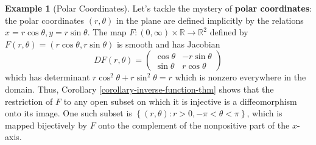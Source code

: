 \documentclass[reqno]{amsart}
\theoremstyle{plain}%
\theoremstyle{definition}
\newtheorem{example}[theorem]{Example}
\theoremstyle{remark}
\begin{document}
        \begin{example}[Polar Coordinates]
          Let's tackle the mystery of \textbf{polar coordinates}: the polar
          coordinates $(r, \theta)$ in the plane are defined implicitly by the
          relations $x = r \cos \theta, y = r \sin \theta$. The map
          $F  \colon \left( 0, \infty \right) \times \mathbb{R} \to 
          \mathbb{R}^2$ defined by $F\left( r, \theta \right) =
          \left( r \cos \theta, r \sin \theta \right) $ is smooth and has
          Jacobian
          \[
          DF(r,\theta) = \begin{pmatrix} 
              \cos \theta & - r \sin \theta\\
              \sin \theta & r \cos \theta
          \end{pmatrix} 
          \] 
          which has determinant $r \cos^2 \theta + r \sin^2 \theta = r$ which is
          nonzero everywhere in the domain. Thus, Corollary
          \ref{corollary-inverse-function-thm} shows that the restriction of $F$ to
          any open subset on which it is injective is a diffeomorphism onto its
          image. One such subset is $\left\{ \left( r, \theta \right)  \colon
          r >0, - \pi < \theta < \pi \right\} $, which is mapped bijectively by $F$ 
          onto the complement of the nonpositive part of the $x$-axis.
        \end{example}
\end{document}
